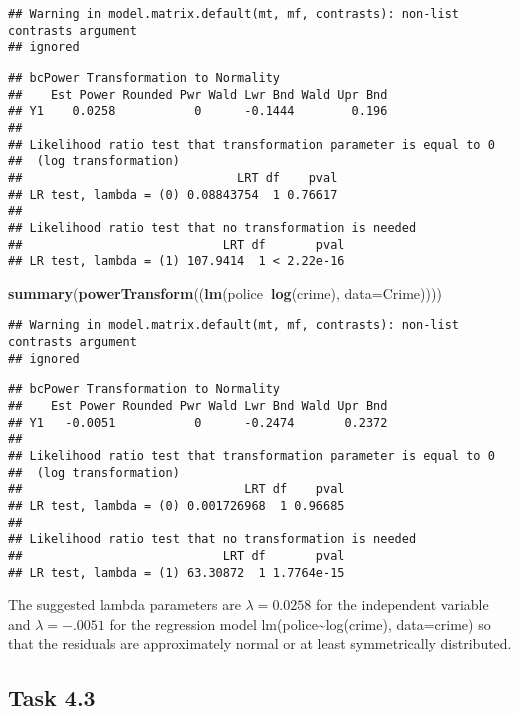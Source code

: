 \documentclass[
]{article}
\newenvironment{Shaded}{\begin{snugshade}}{\end{snugshade}}
\newcommand{\DataTypeTok}[1]{\textcolor[rgb]{0.13,0.29,0.53}{#1}}
\newcommand{\KeywordTok}[1]{\textcolor[rgb]{0.13,0.29,0.53}{\textbf{#1}}}
\newcommand{\NormalTok}[1]{#1}
\newcommand{\OperatorTok}[1]{\textcolor[rgb]{0.81,0.36,0.00}{\textbf{#1}}}
\begin{document}
\begin{verbatim}
## Warning in model.matrix.default(mt, mf, contrasts): non-list contrasts argument
## ignored
\end{verbatim}

\begin{verbatim}
## bcPower Transformation to Normality 
##    Est Power Rounded Pwr Wald Lwr Bnd Wald Upr Bnd
## Y1    0.0258           0      -0.1444        0.196
## 
## Likelihood ratio test that transformation parameter is equal to 0
##  (log transformation)
##                              LRT df    pval
## LR test, lambda = (0) 0.08843754  1 0.76617
## 
## Likelihood ratio test that no transformation is needed
##                            LRT df       pval
## LR test, lambda = (1) 107.9414  1 < 2.22e-16
\end{verbatim}

\begin{Shaded}
\begin{Highlighting}[]
\KeywordTok{summary}\NormalTok{(}\KeywordTok{powerTransform}\NormalTok{((}\KeywordTok{lm}\NormalTok{(police}\OperatorTok{~}\KeywordTok{log}\NormalTok{(crime), }\DataTypeTok{data=}\NormalTok{Crime))))}
\end{Highlighting}
\end{Shaded}

\begin{verbatim}
## Warning in model.matrix.default(mt, mf, contrasts): non-list contrasts argument
## ignored
\end{verbatim}

\begin{verbatim}
## bcPower Transformation to Normality 
##    Est Power Rounded Pwr Wald Lwr Bnd Wald Upr Bnd
## Y1   -0.0051           0      -0.2474       0.2372
## 
## Likelihood ratio test that transformation parameter is equal to 0
##  (log transformation)
##                               LRT df    pval
## LR test, lambda = (0) 0.001726968  1 0.96685
## 
## Likelihood ratio test that no transformation is needed
##                            LRT df       pval
## LR test, lambda = (1) 63.30872  1 1.7764e-15
\end{verbatim}

The suggested lambda parameters are \(\lambda = 0.0258\) for the
independent variable and \(\lambda = -.0051\) for the regression model
lm(police\textasciitilde{}log(crime), data=crime) so that the residuals
are approximately normal or at least symmetrically distributed.

\hypertarget{task-4.3}{%
\subsection{Task 4.3}\label{task-4.3}}
\end{document}
